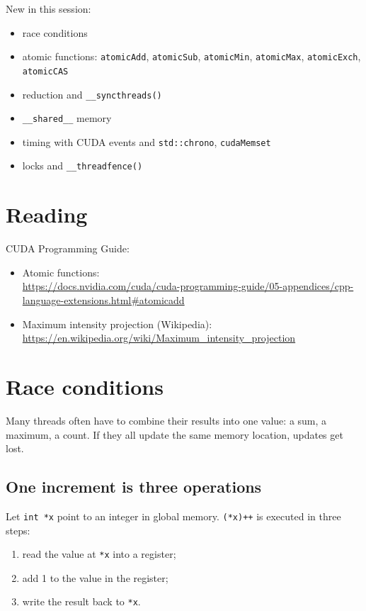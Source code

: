 \documentclass[main.tex]{subfiles}
\begin{document}

New in this session:
\begin{itemize}[nosep]
  \item race conditions
  \item atomic functions: \texttt{atomicAdd}, \texttt{atomicSub}, \texttt{atomicMin}, \texttt{atomicMax}, \texttt{atomicExch}, \texttt{atomicCAS}
  \item reduction and \texttt{\_\_syncthreads()}
  \item \texttt{\_\_shared\_\_} memory
  \item timing with CUDA events and \texttt{std::chrono}, \texttt{cudaMemset}
  \item locks and \texttt{\_\_threadfence()}
\end{itemize}

\section{Reading}

CUDA Programming Guide:
\begin{itemize}[nosep]
  \item Atomic functions:\\
    \url{https://docs.nvidia.com/cuda/cuda-programming-guide/05-appendices/cpp-language-extensions.html#atomicadd}
    \item Maximum intensity projection (Wikipedia):\\ \url{https://en.wikipedia.org/wiki/Maximum_intensity_projection}
\end{itemize}

\section{Race conditions}
\label{sec:race}

Many threads often have to combine their results into one value: a sum, a maximum, a count.
If they all update the same memory location, updates get lost.

\subsection{One increment is three operations}

Let \texttt{int *x} point to an integer in global memory. \texttt{(*x)++} is executed in three steps:
\begin{enumerate}[nosep]
  \item read the value at \texttt{*x} into a register;
  \item add 1 to the value in the register;
  \item write the result back to \texttt{*x}.
\end{enumerate}
\end{document}
